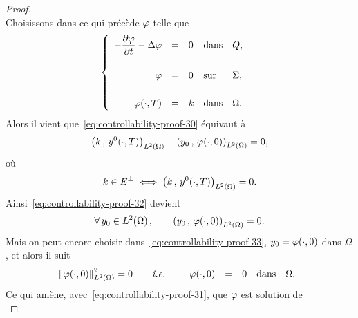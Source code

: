 \begin{proof}
\begin{equation}
    \end{equation}
    Choisissons dans ce qui précède $\varphi$ telle que
    \begin{equation}\label{eq:controllability-proof-31}
        \begin{cases}\displaystyle
            \begin{array}{rclll}
                -\dfrac{\partial{}\varphi}{\partial{}t} - \Delta\varphi & = & 0 & \text{dans} &
                Q,\\
                \\
                \varphi & = & 0 & \text{sur} & \Sigma,\\
                \\
                \varphi\!\left({\cdot,T}\right) & = & k & \text{dans} &
                \Omega.
            \end{array}
        \end{cases}
    \end{equation}
    Alors il vient que~\eqref{eq:controllability-proof-30} équivaut à
    \begin{equation}\label{eq:controllability-proof-32}
        \scalaireohm{k}{y^{0}\!\left({\cdot,T}\right)} - \scalaireohm{%
            y_{0}
        }{%
            \vphi\!\left({\cdot,0}\right)
        } = 0,
    \end{equation}
    où
    \begin{equation*}
        k\in E^{\perp}\iff {\left({ k\,,\,y^{0}\!\left({\cdot,T}\right) }\right)}_{L^{2}\left({\Omega}\right)} =
        0.
    \end{equation*}
    Ainsi~\eqref{eq:controllability-proof-32} devient
    \begin{equation}\label{eq:controllability-proof-33}
        \forall\,y_{0}\in\Ldeux{\Omega},\qquad \scalaireohm{y_{0}}{%
            \vphi\!\left({\cdot,0}\right)
        } = 0.
    \end{equation}
    Mais on peut encore choisir dans~\eqref{eq:controllability-proof-33},
    $\displaystyle y_{0} = \varphi\!\left({\cdot,0}\right)$ dans $\Omega$, et
    alors il suit
    \begin{equation*}
        {\left\|{\varphi\!\left({\cdot,0}\right) }\right\|}_{L^{2}\left({\Omega}\right)}^{2} = 0\qquad\textit{i.e.}\qquad
        \begin{array}{rclll}
            \varphi\!\left({\cdot,0}\right) & = & 0 & \text{dans} & \Omega.
        \end{array}
    \end{equation*}
    Ce qui amène, avec~\eqref{eq:controllability-proof-31}, que $\varphi$
    est solution de
    \begin{equation*}

\end{equation*}
\end{proof}
